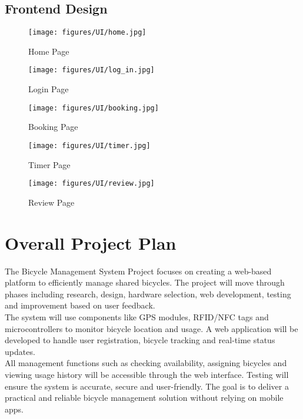 \subsection{Frontend Design}
\begin{figure}[H]
    \centering
    \texttt{[image: figures/UI/home.jpg]} %
    \caption{Home Page}
    \label{fig:sample}
\end{figure}
\begin{figure}[H]
    \centering
    \texttt{[image: figures/UI/log\_in.jpg]} %
    \caption{Login Page}
    \label{fig:sample}
\end{figure}
\begin{figure}[H]
    \centering
    \texttt{[image: figures/UI/booking.jpg]} %
    \caption{Booking Page}
    \label{fig:sample}
\end{figure}
\begin{figure}[H]
    \centering
    \texttt{[image: figures/UI/timer.jpg]} %
    \caption{Timer Page}
    \label{fig:sample}
\end{figure}
\begin{figure}[H]
    \centering
    \texttt{[image: figures/UI/review.jpg]} %
    \caption{Review Page}
    \label{fig:sample}
\end{figure}
    
\section{Overall Project Plan}
The Bicycle Management System Project focuses on creating a web-based platform to efficiently manage shared bicycles. The project will move through phases including research, design, hardware selection, web development, testing and improvement based on user feedback.\\

\noindent The system will use components like GPS modules, RFID/NFC tags and microcontrollers to monitor bicycle location and usage. A web application will be developed to handle user registration, bicycle tracking and real-time status updates.\\

\noindent All management functions such as checking availability, assigning bicycles  and viewing usage history will be accessible through the web interface. Testing will ensure the system is accurate, secure and user-friendly. The goal is to deliver a practical and reliable bicycle management solution without relying on mobile apps.\cite{2.2}\\

